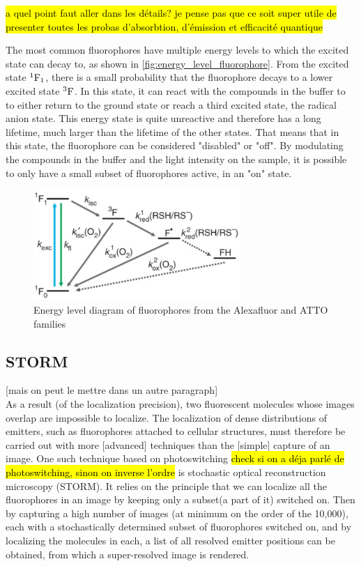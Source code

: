 \hl{a quel point faut aller dans les détails? je pense pas que ce soit super utile de presenter toutes les probas d'absorbtion, d'émission et efficacité quantique}

The most common fluorophores have multiple energy levels to which the excited state can decay to, as shown in \autoref{fig:energy_level_fluorophore}. From the excited state $^1\textrm F_1$, there is a small probability that the fluorophore decays to a lower excited state $^3\textrm F$. In this state, it can react with the compounds in the buffer to to either return to the ground state or reach a third excited state, the radical anion state. This energy state is quite unreactive and therefore has a long lifetime, much larger than the lifetime of the other states. That means that in this state, the fluorophore can be considered "disabled" or "off". By modulating the compounds in the buffer and the light intensity on the sample, it is possible to only have a small subset of fluorophores active, in an "on" state.
\begin{figure}[htbp]
    \centering
    \includegraphics[width=0.7\textwidth]{figures/alexafluor-jablonski-diagram.png}
    \caption{Energy level diagram of fluorophores from the Alexafluor and ATTO families \cite{vandelinde-natureprotocols-2011}}
    \label{fig:energy_level_fluorophore}
\end{figure}

\subsection{STORM} [mais on peut le mettre dans un autre paragraph] \\
As a result (of the localization precision), two fluorescent molecules whose images overlap are impossible to localize.
The localization of dense distributions of emitters, such as fluorophores attached to cellular structures, must therefore be carried out with more [advanced] techniques than the [simple] capture of an image.
One such technique based on photoswitching \hl{check si on a déja parlé de photoswitching, sinon on inverse l'ordre} is stochastic optical reconstruction microscopy (STORM).
It relies on the principle that we can localize all the fluorophores in an image by keeping only a subset(a part of it) switched on.
Then by capturing a high number of images (at minimum on the order of the 10,000), each with a stochastically determined subset of fluorophores switched on, and by localizing the molecules in each, a list of all resolved emitter positions can be obtained, from which a super-resolved image is rendered.

